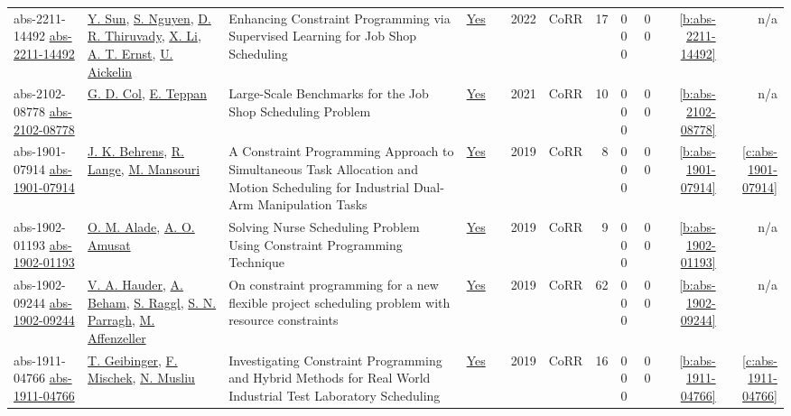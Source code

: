 {\begin{longtable}{>{\raggedright\arraybackslash}p{3cm}>{\raggedright\arraybackslash}p{4.5cm}>{\raggedright\arraybackslash}p{6.0cm}rrrp{2.5cm}rp{1cm}p{1cm}rr}
abs-2211-14492 \href{https://doi.org/10.48550/arXiv.2211.14492}{abs-2211-14492} & \hyperref[auth:a397]{Y. Sun}, \hyperref[auth:a395]{S. Nguyen}, \hyperref[auth:a396]{D. R. Thiruvady}, \hyperref[auth:a468]{X. Li}, \hyperref[auth:a469]{A. T. Ernst}, \hyperref[auth:a470]{U. Aickelin} & Enhancing Constraint Programming via Supervised Learning for Job Shop Scheduling & \href{../works/abs-2211-14492.pdf}{Yes} & \cite{abs-2211-14492} & 2022 & CoRR & 17 & 0 0 0 & 0 0 & \ref{b:abs-2211-14492} & n/a\\
abs-2102-08778 \href{https://arxiv.org/abs/2102.08778}{abs-2102-08778} & \hyperref[auth:a93]{G. D. Col}, \hyperref[auth:a608]{E. Teppan} & Large-Scale Benchmarks for the Job Shop Scheduling Problem & \href{../works/abs-2102-08778.pdf}{Yes} & \cite{abs-2102-08778} & 2021 & CoRR & 10 & 0 0 0 & 0 0 & \ref{b:abs-2102-08778} & n/a\\
abs-1901-07914 \href{http://arxiv.org/abs/1901.07914}{abs-1901-07914} & \hyperref[auth:a540]{J. K. Behrens}, \hyperref[auth:a541]{R. Lange}, \hyperref[auth:a542]{M. Mansouri} & A Constraint Programming Approach to Simultaneous Task Allocation and Motion Scheduling for Industrial Dual-Arm Manipulation Tasks & \href{../works/abs-1901-07914.pdf}{Yes} & \cite{abs-1901-07914} & 2019 & CoRR & 8 & 0 0 0 & 0 0 & \ref{b:abs-1901-07914} & \ref{c:abs-1901-07914}\\
abs-1902-01193 \href{http://arxiv.org/abs/1902.01193}{abs-1902-01193} & \hyperref[auth:a548]{O. M. Alade}, \hyperref[auth:a549]{A. O. Amusat} & Solving Nurse Scheduling Problem Using Constraint Programming Technique & \href{../works/abs-1902-01193.pdf}{Yes} & \cite{abs-1902-01193} & 2019 & CoRR & 9 & 0 0 0 & 0 0 & \ref{b:abs-1902-01193} & n/a\\
abs-1902-09244 \href{http://arxiv.org/abs/1902.09244}{abs-1902-09244} & \hyperref[auth:a550]{V. A. Hauder}, \hyperref[auth:a551]{A. Beham}, \hyperref[auth:a552]{S. Raggl}, \hyperref[auth:a553]{S. N. Parragh}, \hyperref[auth:a554]{M. Affenzeller} & On constraint programming for a new flexible project scheduling problem with resource constraints & \href{../works/abs-1902-09244.pdf}{Yes} & \cite{abs-1902-09244} & 2019 & CoRR & 62 & 0 0 0 & 0 0 & \ref{b:abs-1902-09244} & n/a\\
abs-1911-04766 \href{http://arxiv.org/abs/1911.04766}{abs-1911-04766} & \hyperref[auth:a77]{T. Geibinger}, \hyperref[auth:a80]{F. Mischek}, \hyperref[auth:a45]{N. Musliu} & Investigating Constraint Programming and Hybrid Methods for Real World Industrial Test Laboratory Scheduling & \href{../works/abs-1911-04766.pdf}{Yes} & \cite{abs-1911-04766} & 2019 & CoRR & 16 & 0 0 0 & 0 0 & \ref{b:abs-1911-04766} & \ref{c:abs-1911-04766}\\

\end{longtable}}
